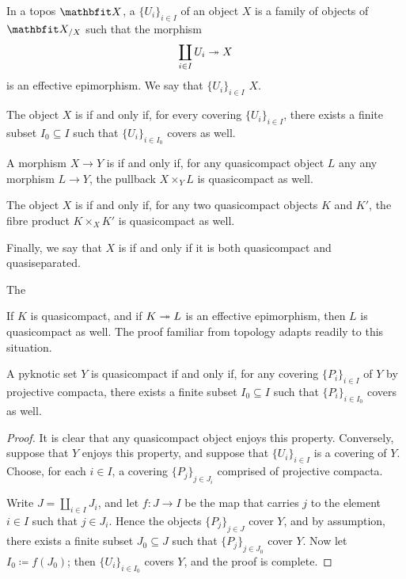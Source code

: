 \begin{nul}
	In a topos $ \XX $, a  $ {\{U_i\}}_{i \in I} $ of an object $ X $ is a family of objects of $ \XX_{/X} $ such that the morphism
	\[
		\coprod_{i \in I} U_i \twoheadrightarrow X
	\]
	is an effective epimorphism.
	We say that $ {\{U_i\}}_{i \in I} $  $ X $.

	The object $ X $ is  if and only if, for every covering $ {\{ U_i \}}_{i \in I} $, there exists a finite subset $ I_0 \subseteq I $ such that $ {\{ U_i \}}_{i \in I_0} $ covers as well.

	A morphism $ X \to Y $ is  if and only if, for any quasicompact object $ L $ any any morphism $ L \to Y $, the pullback $ X \times_Y L $ is quasicompact as well.

	The object $ X $ is  if and only if, for any two quasicompact objects $ K $ and $ K' $, the fibre product $ K \times_X K' $ is quasicompact as well.

	Finally, we say that $ X $ is  if and only if it is both quasicompact and quasiseparated.
\end{nul}

\begin{nul}
	The 

	If $ K $ is quasicompact, and if $ K \twoheadrightarrow L $ is an effective epimorphism, then $ L $ is quasicompact as well.
	The proof familiar from topology adapts readily to this situation.
\end{nul}

\begin{lem}
	A pyknotic set $ Y $ is quasicompact if and only if, for any covering $ {\{ P_i \}}_{i \in I} $ of $ Y $ by projective compacta, there exists a finite subset $ I_0 \subseteq I $ such that $ {\{P_i\}}_{i \in I_0} $ covers as well.
\end{lem}

\begin{proof}
	It is clear that any quasicompact object enjoys this property.
	Conversely, suppose that $ Y $ enjoys this property, and suppose that $ {\{ U_i \}}_{i \in I} $ is a covering of $ Y $. 
	Choose, for each $ i \in I $, a covering $ {\{ P_j \}}_{j \in J_i} $ comprised of projective compacta.
	
	Write $ J = \coprod_{i \in I} J_i $, and let $ f \colon J \to I $ be the map that carries $ j $ to the element $ i \in I $ such that $ j \in J_i $.
	Hence the objects $ {\{ P_j \}}_{j \in J} $ cover $ Y $, 
	and by assumption, there exists a finite subset $ J_0 \subseteq J $ such that $ {\{ P_j \}}_{j \in J_0} $ cover $ Y $. 
	Now let $ I_0 \coloneq f(J_0) $;
	then $ {\{ U_i \}}_{i \in I_0} $ covers $ Y $, and the proof is complete.
\end{proof}

